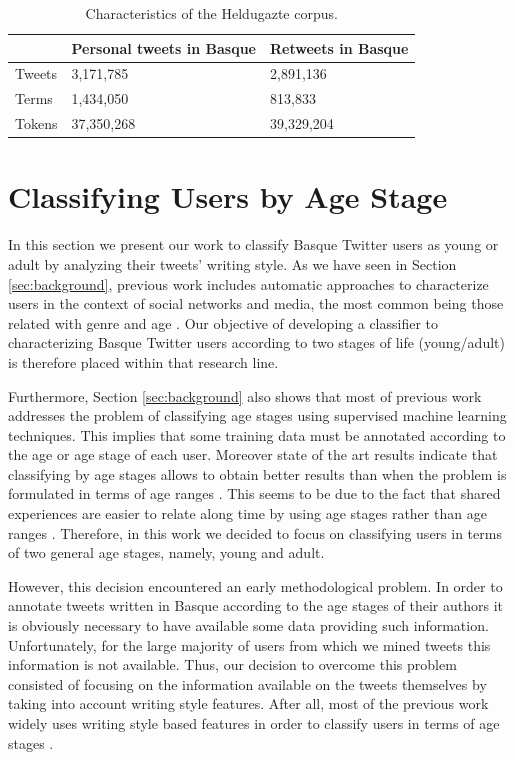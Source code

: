\documentclass[information,article,submit,moreauthors,pdftex,10pt,a4paper]{Definitions/mdpi}
\begin{document}
\begin{table}[H]
  \centering
  \begin{tabular}{lll} \hline
     & Personal tweets in Basque & Retweets in Basque \\ \hline \hline
    Tweets & 3,171,785 & 2,891,136 \\
    Terms & 1,434,050 & 813,833 \\
    Tokens & 37,350,268 & 39,329,204 \\ \hline
  \end{tabular}
  \caption{Characteristics of the Heldugazte corpus.}
  \label{tab:useful-data}
\end{table}

\section{Classifying Users by Age Stage}\label{sec:class-young-users}

In this section we present our work to classify Basque Twitter users as young or adult by analyzing their tweets' writing style. As we have seen in Section \ref{sec:background}, previous work includes automatic approaches to characterize users in the context of social networks and media, the most common being those related with genre and age \citep{cesare2017detection}. Our objective of developing a classifier to characterizing Basque Twitter users according to two stages of life (young/adult) is therefore placed within that research line.

Furthermore, Section \ref{sec:background} also shows that most of previous work addresses the problem of classifying age stages using supervised machine learning techniques. This implies that some training data must be annotated according to the age or age stage of each user. Moreover state of the art  results indicate that classifying by age stages allows to obtain better results than when the problem is formulated in terms of age ranges \citep{nguyen2013old}. This seems to be due to the fact that shared experiences are easier to relate along time by using age stages rather than age ranges \citep{nguyen2016computational,eckert2017age}. Therefore, in this work we decided to focus on classifying users in terms of two general age stages, namely, young and adult.

However, this decision encountered an early methodological problem. In order to annotate tweets written in Basque according to the age stages of their authors it is obviously necessary to have available some data providing such information. Unfortunately, for the large majority of users from which we mined tweets this information is not available. Thus, our decision to overcome this problem consisted of focusing on the information available on the tweets themselves by taking into account writing style features. After all, most of the previous work widely uses writing style based features in order to classify users in terms of age stages \citep{rao2010classifying,al2012homophily,nguyen2013old,morgan2017predicting}.
\end{document}
